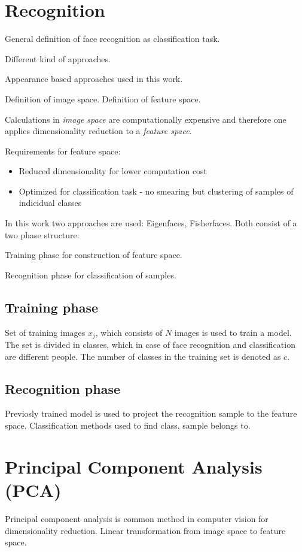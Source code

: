 \newpage
\section{Recognition}


 General definition of face recognition as classification task.

 Different kind of approaches.

Appearance based approaches used in this work.

Definition of image space.
Definition of feature space.

Calculations in \textit{image space} are computationally expensive and  therefore
one applies dimensionality reduction to a \textit{feature space}.

Requirements for feature space:
\begin{itemize}
\item Reduced dimensionality for lower computation cost
\item Optimized for classification task - no smearing but clustering of samples of indicidual classes
\end{itemize}

In this work two approaches are used: Eigenfaces, Fisherfaces.
Both consist of a two phase structure:

Training phase for construction of feature space.

Recognition phase for classification of samples.


\subsection{Training phase}
Set of training images ${ x_j }$, which consists of $N$ images is used to train a model.
The set is divided in classes, which in case of face recognition and classification are
 different people. The number of classes in the training set is denoted as $c$.

\subsection{Recognition phase}
Previosly trained model is used to project the recognition sample to the feature space.
Classification methods used to find class, sample belongs to.


\section{Principal Component Analysis (PCA)}
Principal component analysis is common method in computer vision for dimensionality reduction.
Linear transformation from image space to feature space.

